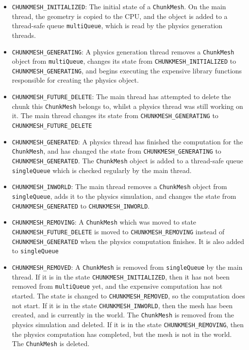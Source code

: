\documentclass[11pt]{article}
\begin{document}
\begin{itemize}
 \item \texttt{CHUNKMESH\_INITIALIZED}: The initial state of a \texttt{ChunkMesh}. On the main thread, the geometry is copied to the CPU, and the object is added to a thread-safe queue \texttt{multiQueue}, which is read by the physics generation threads.
 \item \texttt{CHUNKMESH\_GENERATING}: A physics generation thread removes a \texttt{ChunkMesh} object from \texttt{multiQueue}, changes its state from \texttt{CHUNKMESH\_INITIALIZED} to \texttt{CHUNKMESH\_GENERATING}, and begins executing the expensive library functions responsible for creating the physics object.
 \item \texttt{CHUNKMESH\_FUTURE\_DELETE}: The main thread has attempted to delete the chunk this \texttt{ChunkMesh} belongs to, whilst a physics thread was still working on it. The main thread changes its state from \texttt{CHUNKMESH\_GENERATING} to \texttt{CHUNKMESH\_FUTURE\_DELETE}
 \item \texttt{CHUNKMESH\_GENERATED}: A physics thread has finished the computation for the \texttt{ChunkMesh}, and has changed the state from \texttt{CHUNKMESH\_GENERATING} to \texttt{CHUNKMESH\_GENERATED}. The \texttt{ChunkMesh} object is added to a thread-safe queue \texttt{singleQueue} which is checked regularly by the main thread.
 \item \texttt{CHUNKMESH\_INWORLD}: The main thread removes a \texttt{ChunkMesh} object from \texttt{singleQueue}, adds it to the physics simulation, and changes the state from \texttt{CHUNKMESH\_GENERATED} to \texttt{CHUNKMESH\_INWORLD}.
 \item \texttt{CHUNKMESH\_REMOVING}: A \texttt{ChunkMesh} which was moved to state \texttt{CHUNKMESH\_FUTURE\_DELETE} is moved to \texttt{CHUNKMESH\_REMOVING} instead of \texttt{CHUNKMESH\_GENERATED} when the physics computation finishes. It is also added to \texttt{singleQueue}
 \item \texttt{CHUNKMESH\_REMOVED}: A \texttt{ChunkMesh} is removed from \texttt{singleQueue} by the main thread. If it is in the state \texttt{CHUNKMESH\_INITIALIZED}, then it has not been removed from \texttt{multiQueue} yet, and the expensive computation has not started. The state is changed to \texttt{CHUNKMESH\_REMOVED}, so the computation does not start. If it is in the state \texttt{CHUNKMESH\_INWORLD}, then the mesh has been created, and is currently in the world. The \texttt{ChunkMesh} is removed from the physics simulation and deleted. If it is in the state \texttt{CHUNKMESH\_REMOVING}, then the physics computation has completed, but the mesh is not in the world. The \texttt{ChunkMesh} is deleted.
\end{itemize}
\end{document}
